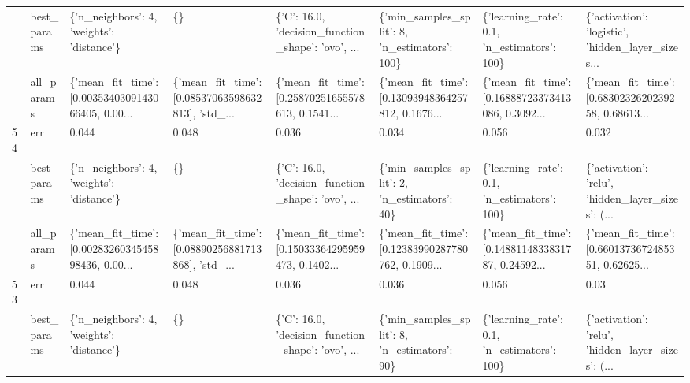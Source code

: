 \begin{tabular}{llllllll}
   & best\_params &          \{'n\_neighbors': 4, 'weights': 'distance'\} &                                                 \{\} &  \{'C': 16.0, 'decision\_function\_shape': 'ovo', ... &      \{'min\_samples\_split': 8, 'n\_estimators': 100\} &        \{'learning\_rate': 0.1, 'n\_estimators': 100\} &  \{'activation': 'logistic', 'hidden\_layer\_sizes... \\
   & all\_params &  \{'mean\_fit\_time': [0.0035340309143066405, 0.00... &  \{'mean\_fit\_time': [0.08537063598632813], 'std\_... &  \{'mean\_fit\_time': [0.25870251655578613, 0.1541... &  \{'mean\_fit\_time': [0.13093948364257812, 0.1676... &  \{'mean\_fit\_time': [0.16888723373413086, 0.3092... &  \{'mean\_fit\_time': [0.6830232620239258, 0.68613... \\
54 & err &                                              0.044 &                                              0.048 &                                              0.036 &                                              0.034 &                                              0.056 &                                              0.032 \\
   & best\_params &          \{'n\_neighbors': 4, 'weights': 'distance'\} &                                                 \{\} &  \{'C': 16.0, 'decision\_function\_shape': 'ovo', ... &       \{'min\_samples\_split': 2, 'n\_estimators': 40\} &        \{'learning\_rate': 0.1, 'n\_estimators': 100\} &  \{'activation': 'relu', 'hidden\_layer\_sizes': (... \\
   & all\_params &  \{'mean\_fit\_time': [0.0028326034545898436, 0.00... &  \{'mean\_fit\_time': [0.08890256881713868], 'std\_... &  \{'mean\_fit\_time': [0.15033364295959473, 0.1402... &  \{'mean\_fit\_time': [0.12383990287780762, 0.1909... &  \{'mean\_fit\_time': [0.1488114833831787, 0.24592... &  \{'mean\_fit\_time': [0.6601373672485351, 0.62625... \\
53 & err &                                              0.044 &                                              0.048 &                                              0.036 &                                              0.036 &                                              0.056 &                                               0.03 \\
   & best\_params &          \{'n\_neighbors': 4, 'weights': 'distance'\} &                                                 \{\} &  \{'C': 16.0, 'decision\_function\_shape': 'ovo', ... &       \{'min\_samples\_split': 8, 'n\_estimators': 90\} &        \{'learning\_rate': 0.1, 'n\_estimators': 100\} &  \{'activation': 'relu', 'hidden\_layer\_sizes': (... \\

\end{tabular}

